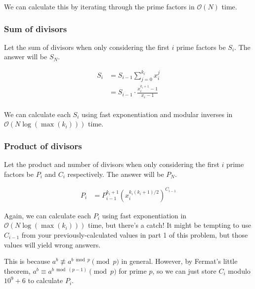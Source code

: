                     We can calculate this by iterating through the prime factors in $\mathcal O(N)$
                    time.
                    
            \subsubsection{Sum of divisors}
            
                Let the sum of divisors when only considering the first $i$ prime factors be $S_i$. The answer will be $S_N$.
                
                $$\begin{aligned} S_i &= S_{i - 1} \sum_{j = 0}^{k_i} x_i^j\\ &= S_{i - 1} \cdot \frac{x_i^{k_i + 1} - 1}{x_i - 1}\\ \end{aligned}$$
                
                We can calculate each $S_i$ using fast exponentiation and modular inverses in
            $\mathcal O(N \log(\max(k_i)))$ time.
            
            \subsubsection{Product of divisors}

                \tab Let the product and number of divisors when only considering the first $i$ prime
                factors be $P_i$ and $C_i$ respectively. The answer will be $P_N$.
                
                $$\begin{aligned} P_i &= P_{i - 1}^{k_i + 1} \left(x_i^{k_i(k_i + 1)/2} \right)^{C_{i - 1}} \end{aligned}$$
                
                Again, we can calculate each $P_i$ using fast exponentiation in
                $\mathcal O(N \log(\max(k_i)))$ time, but there's a catch! It might be tempting
                to use $C_{i - 1}$ from your previously-calculated values in part 1 of this
                problem, but those values will yield wrong answers.
                
                This is because $a^b \not \equiv a^{b \bmod p} \pmod{p}$ in general. However, by
                Fermat's little theorem, $a^b \equiv a^{b \bmod (p - 1)} \pmod{p}$ for prime
                $p$, so we can just store $C_i$ modulo $10^9 + 6$ to calculate $P_i$.

